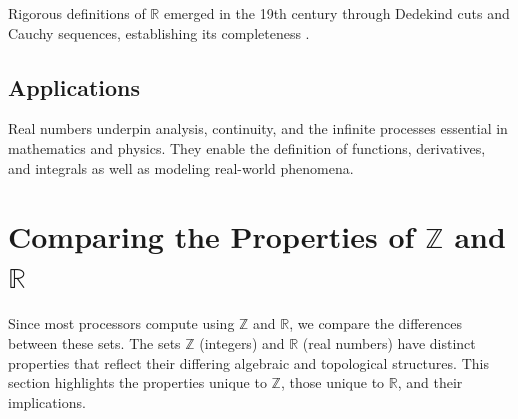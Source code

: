 Rigorous definitions of \( \mathbb{R} \) emerged in the 19th century through Dedekind cuts and Cauchy sequences, establishing its completeness \cite{rosen2018, stewart2015-foundations}.

\subsection{Applications}
Real numbers underpin analysis, continuity, and the infinite processes essential in mathematics and physics. They enable the definition of functions, derivatives, and integrals as well as modeling real-world phenomena.

\section{Comparing the Properties of \( \mathbb{Z} \) and \( \mathbb{R} \)}
Since most processors compute using $\mathbb{Z}$ and $\mathbb{R}$, we compare the differences between these sets.
The sets \( \mathbb{Z} \) (integers) and \( \mathbb{R} \) (real numbers) have distinct properties that reflect their differing algebraic and topological structures. This section highlights the properties unique to \( \mathbb{Z} \), those unique to \( \mathbb{R} \), and their implications.

